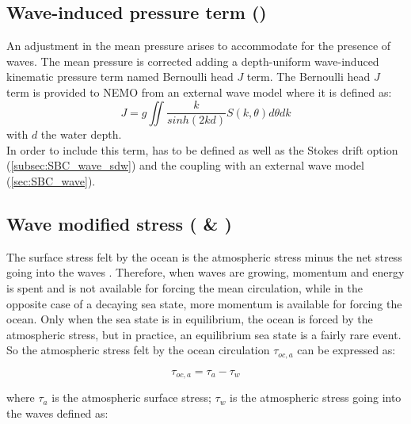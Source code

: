 \documentclass[../main/NEMO_manual]{subfiles}
\begin{document}

\subsection[Wave-induced pressure term (\forcode{ln_bern_srfc})]{ Wave-induced pressure term (\protect{})}
\label{subsec:SBC_wave_bhd}
An adjustment in the mean pressure arises to accommodate for the presence of waves.
The mean pressure is corrected adding a depth-uniform wave-induced kinematic pressure term named Bernoulli head $J$ term. The Bernoulli head $J$ term is provided to NEMO from an external wave model where it is defined as:
\[
  J = g \iint {\frac{k}{sinh(2kd)} S(k,\theta) d\theta dk}
\]
with $d$ the water depth. \\
In order to include this term,  has to be defined as well as the Stokes drift option (\autoref{subsec:SBC_wave_sdw}) and the coupling with an external wave model (\autoref{sec:SBC_wave}).



\subsection[Wave modified stress (\forcode{ln_tauoc} \& \forcode{ln_taw})]{Wave modified stress (\protect{} \& )}
\label{subsec:SBC_wave_taw}

The surface stress felt by the ocean is the atmospheric stress minus the net stress going
into the waves \citep{janssen.breivik.ea_trpt13}. Therefore, when waves are growing, momentum and energy is spent and is not
available for forcing the mean circulation, while in the opposite case of a decaying sea
state, more momentum is available for forcing the ocean.
Only when the sea state is in equilibrium, the ocean is forced by the atmospheric stress,
but in practice, an equilibrium sea state is a fairly rare event.
So the atmospheric stress felt by the ocean circulation $\tau_{oc,a}$ can be expressed as:

\[
  \tau_{oc,a} = \tau_a - \tau_w
\]

where $\tau_a$ is the atmospheric surface stress; $\tau_w$ is the atmospheric stress going into the waves defined as:
\end{document}
